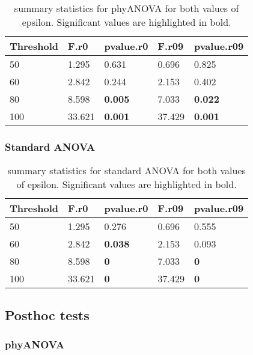 \documentclass[]{article}
\begin{document}
\begin{table}[H]

\caption{\label{tab:unnamed-chunk-17}summary statistics for phyANOVA for both values of epsilon. Significant values are highlighted in bold.}
\centering
\begin{tabular}{l|l|l|l|l}
\hline
Threshold & F.r0 & pvalue.r0 & F.r09 & pvalue.r09\\
\hline
50 & 1.295 & 0.631 & 0.696 & 0.825\\
\hline
60 & 2.842 & 0.244 & 2.153 & 0.402\\
\hline
80 & 8.598 & \textbf{0.005} & 7.033 & \textbf{0.022}\\
\hline
100 & 33.621 & \textbf{0.001} & 37.429 & \textbf{0.001}\\
\hline
\end{tabular}
\end{table}

\hypertarget{standard-anova-2}{%
\subsubsection{Standard ANOVA}\label{standard-anova-2}}

\begin{table}[H]

\caption{\label{tab:unnamed-chunk-18}summary statistics for standard ANOVA for both values of epsilon. Significant values are highlighted in bold.}
\centering
\begin{tabular}{l|l|l|l|l}
\hline
Threshold & F.r0 & pvalue.r0 & F.r09 & pvalue.r09\\
\hline
50 & 1.295 & 0.276 & 0.696 & 0.555\\
\hline
60 & 2.842 & \textbf{0.038} & 2.153 & 0.093\\
\hline
80 & 8.598 & \textbf{0} & 7.033 & \textbf{0}\\
\hline
100 & 33.621 & \textbf{0} & 37.429 & \textbf{0}\\
\hline
\end{tabular}
\end{table}

\hypertarget{posthoc-tests-1}{%
\subsection{Posthoc tests}\label{posthoc-tests-1}}

\hypertarget{phyanova-3}{%
\subsubsection{phyANOVA}\label{phyanova-3}}
\end{document}
